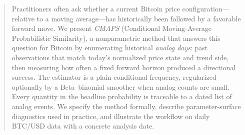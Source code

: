 \begin{abstract}
Practitioners often ask whether a current Bitcoin price configuration---relative to a moving average---has historically been followed by a favorable forward move.
We present \emph{CMAPS} (Conditional Moving-Average Probabilistic Similarity), a nonparametric method that answers this question for Bitcoin by enumerating historical \emph{analog days}: past observations that match today's normalized price state and trend side, then measuring how often a fixed forward horizon produced a directional success.
The estimator is a plain conditional frequency, regularized optionally by a Beta--binomial smoother when analog counts are small.
Every quantity in the headline probability is traceable to a dated list of analog events.
We specify the method formally, describe parameter-surface diagnostics used in practice, and illustrate the workflow on daily BTC/USD data with a concrete analysis date.
\end{abstract}
